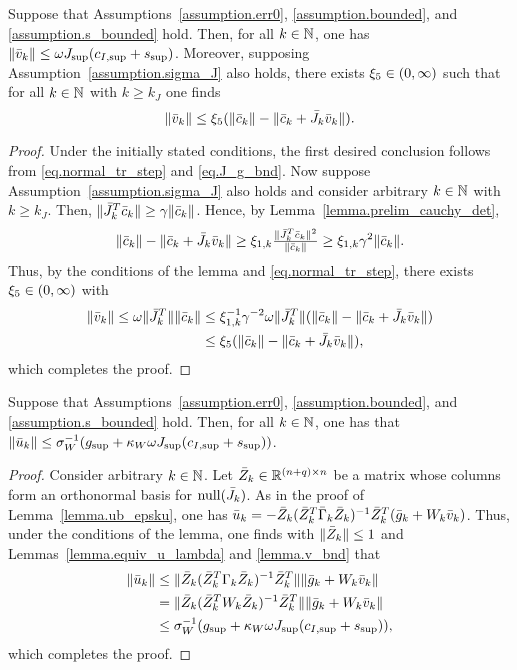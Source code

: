 \begin{lemma}\label{lemma.v_bnd}
  Suppose that Assumptions~\ref{assumption.err0}, \ref{assumption.bounded}, and \ref{assumption.s_bounded} hold.  Then, for all $k \in \mathbb{N}$, one has $\|{\bar v}_k \| \leq \omega J_{\sup} (c_{I,\sup} + s_{\sup})$.  Moreover, supposing Assumption~\ref{assumption.sigma_J} also holds, there exists $\xi_5 \in (0,\infty)$ such that for all $k \in \mathbb{N}$ with $k \geq k_J$ one finds $$\|{\bar v}_k \| \leq  \xi_5 (\| {\bar c}_k\| - \|{\bar c}_k + {\bar J}_k {\bar v}_k\|).$$
\end{lemma}
\begin{proof}
  Under the initially stated conditions, the first desired conclusion follows from \eqref{eq.normal_tr_step} and \eqref{eq.J_g_bnd}.  Now suppose Assumption~\ref{assumption.sigma_J} also holds and consider arbitrary $k \in \mathbb{N}$ with $k \geq k_J$.  Then, $\|{\bar J}_k^T {\bar c}_k \| \geq \gamma \|{\bar c}_k\|$. Hence, by Lemma~\ref{lemma.prelim_cauchy_det},
  \begin{align*}
    \|{\bar c}_k \| - \|{\bar c}_k + {\bar J}_k {\bar v}_k \| \geq  \xi_{1, k} \tfrac{\|{\bar J}_k^T {\bar c}_k\|^2}{\|{\bar c}_k\|} 
    \geq    \xi_{1, k} \gamma^2 \|{\bar c}_k\|.
  \end{align*}
  Thus, by the conditions of the lemma and \eqref{eq.normal_tr_step}, there exists $\xi_5 \in (0,\infty)$ with
  \begin{align*}
    \|{\bar v}_k\| \leq \omega \|{\bar J}_k^T\| \|{\bar c}_k\| 
    &\leq \xi_{1, k}^{-1} \gamma^{-2} \omega \|{\bar J}_k^T\| (\|{\bar c}_k\| - \|{\bar c}_k + {\bar J}_k {\bar v}_k \|) \\
    &\leq  \xi_5 (\|{\bar c}_k\| - \|{\bar c}_k + {\bar J}_k {\bar v}_k\|),
  \end{align*}
  which completes the proof.
\end{proof}

\begin{lemma}\label{lemma.u_bnd}
  Suppose that Assumptions~\ref{assumption.err0}, \ref{assumption.bounded}, and \ref{assumption.s_bounded} hold.  Then, for all $k \in \mathbb{N}$, one has that $\|{\bar u}_k \| \leq \sigma_W^{-1} (g_{\sup} + \kappa_W \omega  J_{\sup} (c_{I,\sup} + s_{\sup}) )$.
\end{lemma}
\begin{proof}
  Consider arbitrary $k \in \mathbb{N}$.  Let ${\bar Z}_k \in \mathbb{R}^{(n+q) \times n}$ be a matrix whose columns form an orthonormal basis for $\mathrm{null}({\bar J}_k)$. As in the proof of Lemma~\ref{lemma.ub_epsku}, one has ${\bar u}_k = - {\bar Z}_k ({\bar Z}_k^T {\bar \Gamma}_k {\bar Z}_k )^{-1} {\bar Z}_k^T ({\bar g}_k + W_k {\bar v}_k)$.  Thus, under the conditions of the lemma, one finds with $\|{\bar Z}_k\| \leq 1$ and Lemmas~\ref{lemma.equiv_u_lambda} and \ref{lemma.v_bnd} that
  \begin{align*}
    \|{\bar u}_k \| &\leq \| {\bar Z}_k ({\bar Z}_k^T \Gamma_k {\bar Z}_k)^{-1} {\bar Z}_k^T \| \| {\bar g}_k + W_k {\bar v}_k \| \\
    &=  \| {\bar Z}_k ({\bar Z}_k^T W_k {\bar Z}_k)^{-1} {\bar Z}_k^T \| \| {\bar g}_k + W_k {\bar v}_k \| \\
    &\leq \sigma_W^{-1} (g_{\sup} + \kappa_W \omega J_{\sup} (c_{I,\sup} + s_{\sup}) ),
  \end{align*}
  which completes the proof.
\end{proof}


